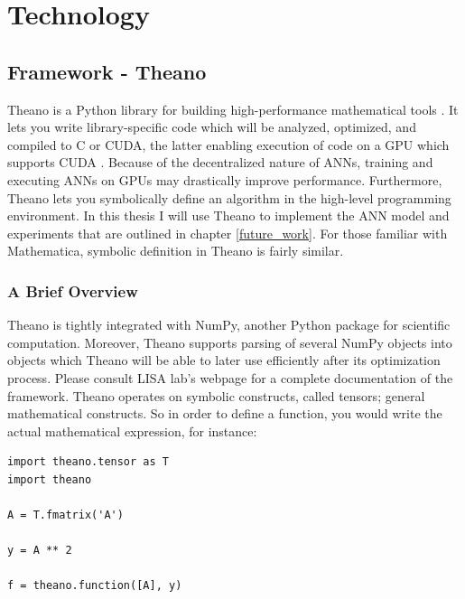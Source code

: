 
\chapter{Technology}\label{chpt:tech}

\section{Framework - Theano}

Theano is a Python library for building high-performance mathematical tools \citep{Bergstra2010}. It lets you write library-specific code which will be analyzed, optimized, and compiled to C or CUDA, the latter enabling execution of code on a GPU which supports CUDA \citep{Bergstra2010}. Because of the decentralized nature of ANNs, training and executing ANNs on GPUs may drastically improve performance. Furthermore, Theano lets you symbolically define an algorithm in the high-level programming environment. In this thesis I will use Theano to implement the ANN model and experiments that are outlined in chapter \ref{future_work}. For those familiar with Mathematica, symbolic definition in Theano is fairly similar.

\subsection{A Brief Overview}

Theano is tightly integrated with NumPy, another Python package for scientific computation. Moreover, Theano supports parsing of several NumPy objects into objects which Theano will be able to later use efficiently after its optimization process. Please consult LISA lab's webpage \citep{LISA-lab2015a} for a complete documentation of the framework.
Theano operates on symbolic constructs, called tensors; general mathematical constructs. So in order to define a function, you would write the actual mathematical expression, for instance:

\begin{verbatim}
import theano.tensor as T
import theano

A = T.fmatrix('A')

y = A ** 2

f = theano.function([A], y)
\end{verbatim}

